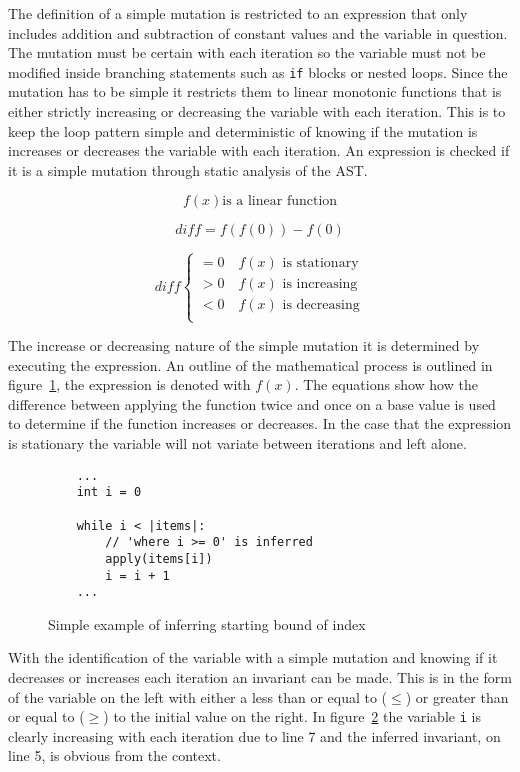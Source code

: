 \documentclass[11pt, a4paper, twoside, openright]{report}
\newcommand{\code}[1]{\texttt{#1}}
\begin{document}
The definition of a simple mutation is restricted to an expression that only
includes addition and subtraction of constant values and the variable in question.
The mutation must be certain with each iteration so the variable must not be
modified inside branching statements such as \code{if} blocks or nested loops.
Since the mutation has to be simple it restricts them to linear monotonic
functions that is either strictly increasing or decreasing the variable with each iteration.
This is to keep the loop pattern simple and deterministic of knowing if the
mutation is increases or decreases the variable with each iteration.
An expression is checked if it is a simple mutation through static analysis of
the AST.

\begin{figure}
    $$f(x) \text{is a linear function}$$

    $$diff = f(f(0)) - f(0)$$

    \[
        diff \begin{cases}
            = 0 \quad f(x) \text{ is stationary}\\
            > 0 \quad f(x) \text{ is increasing}\\
            < 0 \quad f(x) \text{ is decreasing}\\
        \end{cases}
    \]
\label{math:simple-mutation}
\end{figure}

The increase or decreasing nature of the simple mutation it is determined by
executing the expression. An outline of the mathematical process is outlined
in figure~\ref{math:simple-mutation}, the expression is denoted with $f(x)$.
The equations show how the difference between applying the function twice and once on a base value is used to
determine if the function increases or decreases.
In the case that the expression is stationary the variable will not variate
between iterations and left alone.

\begin{figure}[ht]
\begin{lstlisting}
    ...
    int i = 0

    while i < |items|:
        // 'where i >= 0' is inferred
        apply(items[i])
        i = i + 1
    ...
\end{lstlisting}
\caption{Simple example of inferring starting bound of index}
\label{lst:whiley-start}
\end{figure}

With the identification of the variable with a simple mutation and knowing
if it decreases or increases each iteration an invariant can be made.
This is in the form of the variable on the left with either a less than or
equal to ($\leq$) or greater than or equal to ($\geq$) to the initial value on the
right.
In figure~\ref{lst:whiley-start} the variable \code{i} is clearly increasing
with each iteration due to line 7 and the inferred invariant, on line 5, is
obvious from the context.
\end{document}
